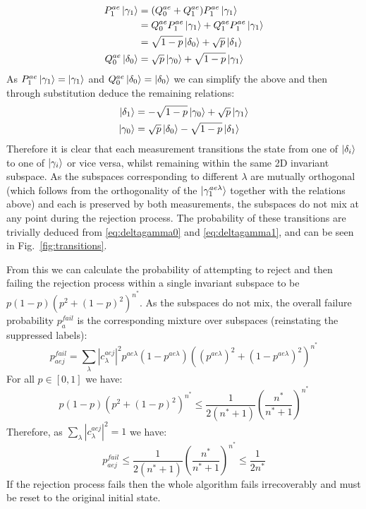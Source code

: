 \begin{align}
\begin{split}
\label{eq:deltagamma0}
    P^{ae}_1 \ket{\gamma_1} &= (Q^{ae}_0+Q^{ae}_1)P^{ae}_1 \ket{\gamma_1}\\
    &= Q^{ae}_0P^{ae}_1 \ket{\gamma_1}+Q^{ae}_1P^{ae}_1 \ket{\gamma_1}\\
    &= \sqrt{1-p} \ket{\delta_0} + \sqrt{p}\ket{\delta_1}\\
    Q^{ae}_0\ket{\delta_0} &= \sqrt{p} \ket{\gamma_0} + \sqrt{1-p} \ket{\gamma_1}
\end{split}
\end{align}
As $P^{ae}_1 \ket{\gamma_1} = \ket{\gamma_1}$ and $Q^{ae}_0\ket{\delta_0} = \ket{\delta_0}$ we can simplify the above and then through substitution deduce the remaining relations:
\begin{align}
\begin{split}
\label{eq:deltagamma1}
        \ket{\delta_1} &= -\sqrt{1-p} \ket{\gamma_0} + \sqrt{p} \ket{\gamma_1}\\
    \ket{\gamma_0} &= \sqrt{p} \ket{\delta_0} - \sqrt{1-p}\ket{\delta_1}
\end{split}
\end{align}
Therefore it is clear that each measurement transitions the state from one of $\ket{\delta_i}$ to one of $\ket{\gamma_i}$ or vice versa, whilst remaining within the same 2D invariant subspace. As the subspaces corresponding to different $\lambda$ are mutually orthogonal (which follows from the orthogonality of the $\ket{\gamma^{ae\lambda}_1}$ together with the relations above) and each is preserved by both measurements, the subspaces do not mix at any point during the rejection process. The probability of these transitions are trivially deduced from \eqref{eq:deltagamma0} and \eqref{eq:deltagamma1}, and can be seen in Fig.~\ref{fig:transitions}.


From this we can calculate the probability of attempting to reject and then failing the rejection process within a single invariant subspace to be $p(1-p)(p^2 +(1-p)^2)^{n^*}$. As the subspaces do not mix, the overall failure probability $p_a^{fail}$ is the corresponding mixture over subspaces (reinstating the suppressed labels):
\begin{equation}
   p_{aej}^{fail} =  \sum_{\lambda}|c^{aej}_{\lambda}|^2p^{ae\lambda}(1-p^{ae\lambda})((p^{ae\lambda})^2 +(1-p^{ae\lambda})^2)^{n^*}
\end{equation}
For all $p \in [0,1]$ we have: 
\begin{equation}
    p(1-p)(p^2 +(1-p)^2)^{n^*} \leq \frac{1}{2(n^*+1)} \left(\frac{n^*}{n^*+1}\right)^{n^*}
\end{equation}
Therefore, as $\sum_{\lambda}|c^{aej}_{\lambda}|^2=1$ we have:
\begin{equation}
    \label{eq:probabilty_of_rejection}
   p_{aej}^{fail} \leq \frac{1}{2(n^*+1)} \left(\frac{n^*}{n^*+1}\right)^{n^*} \leq \frac{1}{2n^*}
\end{equation}
If the rejection process fails then the whole algorithm fails irrecoverably and must be reset to the original initial state.

